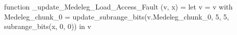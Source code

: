 function _update_Medeleg_Load_Access_Fault (v, x) = let v = { v with Medeleg_chunk_0 = update_subrange_bits(v.Medeleg_chunk_0, 5, 5, subrange_bits(x, 0, 0)) } in
  v
